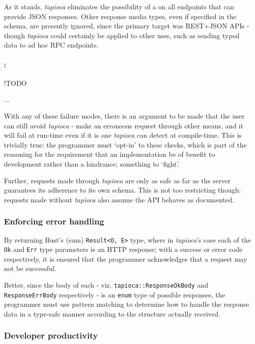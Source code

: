 As it stands, \emph{tapioca} eliminates the possibility of a  on all endpoints that can provide JSON responses. Other response media types, even if specified in the schema, are presently ignored, since the primary target was REST+JSON APIs - though \emph{tapioca} could certainly be applied to other uses, such as sending typed data to ad hoc RPC endpoints.

\paragraph{:} !TODO

...

With any of these failure modes, there is an argument to be made that the user can still avoid \emph{tapioca} - make an erroneous request through other means, and it will fail at run-time even if it is one \emph{tapioca} can detect at compile-time. This is trivially true: the programmer must `opt-in' to these checks, which is part of the reasoning for the requirement that an implementation be of benefit to development rather than a hindrance; something to `fight'.

Further, requests made through \emph{tapioca} are only as safe as far as the server guarantees its adherence to its own schema. This is not too restricting though: requests made without \emph{tapioca} also assume the API behaves as documented.

\subsubsection{Enforcing error handling} \label{concl:eval:err-handle}

By returning Rust's (sum) \texttt{Result<O, E>} type, where in \emph{tapioca}'s case each of the \texttt{Ok} and \texttt{Err} type parameters is an HTTP response; with a success or error code respectively, it is ensured that the programmer acknowledges that a request may not be successful.

Better, since the body of each - viz. \texttt{tapioca::ResponseOkBody} and \texttt{ResponseErrBody} respectively - is an \texttt{enum} type of possible responses, the programmer must use pattern matching to determine how to handle the response data in a type-safe manner according to the structure actually received.

\subsubsection{Developer productivity} \label{concl:eval:productivity}

